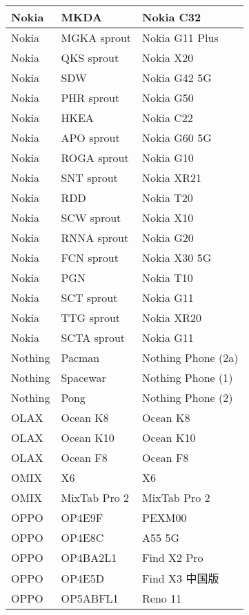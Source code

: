 \begin{tabularx}{\linewidth}{|l|X|X|}
        Nokia & MKDA & Nokia C32 \\ \hline
        Nokia & MGKA sprout & Nokia G11 Plus \\ \hline
        Nokia & QKS sprout & Nokia X20 \\ \hline
        Nokia & SDW & Nokia G42 5G \\ \hline
        Nokia & PHR sprout & Nokia G50 \\ \hline
        Nokia & HKEA & Nokia C22 \\ \hline
        Nokia & APO sprout & Nokia G60 5G \\ \hline
        Nokia & ROGA sprout & Nokia G10 \\ \hline
        Nokia & SNT sprout & Nokia XR21 \\ \hline
        Nokia & RDD & Nokia T20 \\ \hline
        Nokia & SCW sprout & Nokia X10 \\ \hline
        Nokia & RNNA sprout & Nokia G20 \\ \hline
        Nokia & FCN sprout & Nokia X30 5G \\ \hline
        Nokia & PGN & Nokia T10 \\ \hline
        Nokia & SCT sprout & Nokia G11 \\ \hline
        Nokia & TTG sprout & Nokia XR20 \\ \hline
        Nokia & SCTA sprout & Nokia G11 \\ \hline
        Nothing & Pacman & Nothing Phone (2a) \\ \hline
        Nothing & Spacewar & Nothing Phone (1) \\ \hline
        Nothing & Pong & Nothing Phone (2) \\ \hline
        OLAX & Ocean K8 & Ocean K8 \\ \hline
        OLAX & Ocean K10 & Ocean K10 \\ \hline
        OLAX & Ocean F8 & Ocean F8 \\ \hline
        OMIX & X6 & X6 \\ \hline
        OMIX & MixTab Pro 2 & MixTab Pro 2 \\ \hline
        OPPO & OP4E9F & PEXM00 \\ \hline
        OPPO & OP4E8C & A55 5G \\ \hline
        OPPO & OP4BA2L1 & Find X2 Pro \\ \hline
        OPPO & OP4E5D & Find X3 中国版 \\ \hline
        OPPO & OP5ABFL1 & Reno 11 \\ \hline

\end{tabularx}
